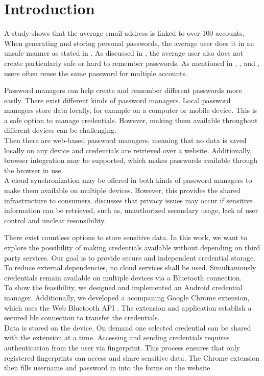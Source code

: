 \section{Introduction} \label{introduction}
A study \cite{DigitalGuardian} shows that the average email address is linked to over 100 accounts.
When generating and storing personal passwords, the average user does it in an unsafe manner as stated in \cite{pilar2012passwords}. As discussed in \cite{AdamsS99}, the average user also does not create particularly safe or hard to remember passwords. As mentioned in \cite{AdamsS99}, \cite{pilar2012passwords}, and \cite{Statista}, users often reuse the same password for multiple accounts.

Password managers can help create and remember different passwords more easily. There exist different kinds of password managers. Local password managers store data locally, for example on a computer or mobile device. This is a safe option to manage credentials. However, making them available throughout different devices can be challenging. \\
Then there are web-based password managers, meaning that no data is saved locally on any device and credentials are retrieved over a website. Additionally, browser integration may be supported, which makes passwords available through the browser in use. \\
A cloud synchronization may be offered in both kinds of password managers to make them available on multiple devices. However, this provides the shared infrastructure to consumers. \cite{SainiM14} discusses that privacy issues may occur if sensitive information can be retrieved, such as, unauthorized secondary usage, lack of user control and unclear resonsibility.

There exist countless options to store sensitive data. In this work, we want to explore the possibility of making credentials available without depending on third party services. Our goal is to provide secure and independent credential storage. To reduce external dependencies, no cloud services shall be used. Simultaniously credentials remain available on multiple devices via a Bluetooth connection. \\
To show the feasibility, we designed and implemented an Android credential manager.  Additionally, we developed a acompaning Google Chrome extension, which uses the Web Bluetooth API \cite{WebBTAPI}. The extension and application establish a secured \gls{ble} connection to transfer the credentials. \\
Data is stored on the device. On demand one selected credential can be shared with the extension at a time. Accessing and sending credentials requires authentication from the user via fingerprint. This process ensures that only registered fingerprints can access and share sensitive data. 
The Chrome extension then fills username and password in into the forms on the website. \\

